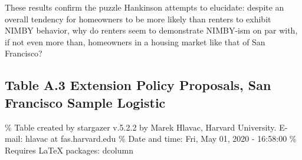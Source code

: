 \documentclass[]{article}
\begin{document}
These results confirm the puzzle Hankinson attempts to elucidate: despite an overall tendency for homeowners to be more likely than renters to exhibit NIMBY behavior, why do renters seem to demonstrate NIMBY-ism on par with, if not even more than, homeowners in a housing market like that of San Francisco?

\hypertarget{table-a.3-extension-policy-proposals-san-francisco-sample-logistic}{%
\subsection{Table A.3 Extension Policy Proposals, San Francisco Sample Logistic}\label{table-a.3-extension-policy-proposals-san-francisco-sample-logistic}}

\% Table created by stargazer v.5.2.2 by Marek Hlavac, Harvard University. E-mail: hlavac at fas.harvard.edu
\% Date and time: Fri, May 01, 2020 - 16:58:00
\% Requires LaTeX packages: dcolumn
\end{document}
